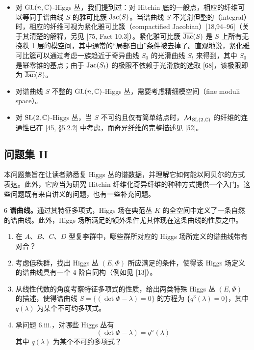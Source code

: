\begin{itemize}[leftmargin=1.4em,itemsep=1pt,topsep=1pt]
\item 对 $\mathrm{GL}(n,\mathbb{C})$-Higgs 丛，我们提到过：对 Hitchin 底的一般点，相应的纤维可以等同于谱曲线 $S$ 的雅可比簇 $\operatorname{Jac}(S)$。当谱曲线 $S$ 不光滑但整的（integral）时，相应的纤维可视为紧化雅可比簇（compactified Jacobian）[18,94--96]（关于其清楚的解释，另见 [75, Fact 10.3]）。紧化雅可比簇 $\overline{\operatorname{Jac}}(S)$ 是 $S$ 上所有无挠秩 1 层的模空间，其中通常的“局部自由”条件被去掉了。直观地说，紧化雅可比簇可以通过考虑一族趋近于奇异曲线 $S_0$ 的光滑曲线 $S_t$ 来得到，其中 $S_0$ 是幂零锥的基点；由于 $\operatorname{Jac}(S_t)$ 的极限不依赖于光滑族的选取 [68]，该极限即为 $\overline{\operatorname{Jac}}(S)$。
\item 对谱曲线 $S$ 不整的 $\mathrm{GL}(n,\mathbb{C})$-Higgs 丛，需要考虑精细模空间（fine moduli space）。
\item 对 $\mathrm{SL}(2,\mathbb{C})$-Higgs 丛，当 $S$ 不可约且仅有简单结点时，$\mathcal{M}_{\mathrm{SL}(2,\mathbb{C})}$ 的纤维的连通性已在 [45, §5.2.2] 中考虑，而奇异纤维的完整描述见 [52]。
\end{itemize}



\subsection{问题集 II}

本问题集旨在让读者熟悉复 Higgs 丛的谱数据，并理解它如何能以阿贝尔的方式表达。此外，它应当为研究 Hitchin 纤维化奇异纤维的种种方式提供一个入门。这些问题既有来自讲义的问题，也有一些补充问题。

\begin{prob}{6}
\textbf{谱曲线。}通过其特征多项式，Higgs 场在典范丛 $K$ 的全空间中定义了一条自然的谱曲线。此外，Higgs 场所满足的额外条件尤其体现在这条曲线的性质之中。

\begin{enumerate}[label=(\roman*),leftmargin=2.2em]
\item 在 $A$、$B$、$C$、$D$ 型复李群中，哪些群所对应的 Higgs 场所定义的谱曲线带有对合？
\item 考虑低秩群，找出 Higgs 丛 $(E,\Phi)$ 所应满足的条件，使得该 Higgs 场定义的谱曲线具有一个 4 阶自同构（例如见 [13]）。
\item 从线性代数的角度考察特征多项式的性质，给出两类特殊 Higgs 丛 $(E,\Phi)$ 的描述，使得谱曲线 $S=\{(\det\Phi-\lambda)=0\}$ 的方程为 $\{q^3(\lambda)=0\}$，其中 $q(\lambda)$ 为某个不可约多项式。
\item 承问题 6.iii.，对哪些 Higgs 丛有
\[
(\det\Phi-\lambda)=q^n(\lambda)
\]
其中 $q(\lambda)$ 为某个不可约多项式？
\end{enumerate}
\end{prob}

